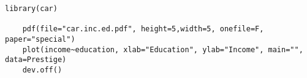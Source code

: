 \begin{lstlisting}[breaklines=true]
    library(car)
    
    pdf(file="car.inc.ed.pdf", height=5,width=5, onefile=F, paper="special")
    plot(income~education, xlab="Education", ylab="Income", main="", data=Prestige)
    dev.off()
\end{lstlisting}
